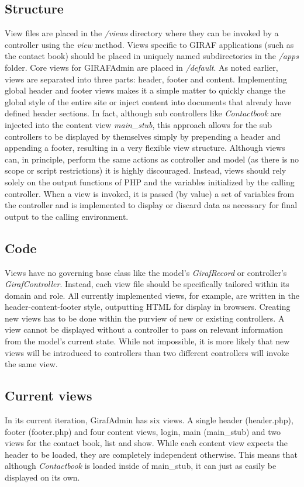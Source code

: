 \subsection{Structure}
View files are placed in the \emph{/views} directory where they can be invoked by a controller using the \emph{view} method. Views specific to GIRAF applications (such as the contact book) should be placed in uniquely named subdirectories in the \emph{/apps} folder. Core views for GIRAFAdmin are placed in \emph{/default}.
As noted earlier, views are separated into three parts: header, footer and content. Implementing global header and footer views makes it a simple matter to quickly change the global style of the entire site or inject content into documents that already have defined header sections. In fact, although sub controllers like \emph{Contactbook} are injected into the content view \emph{main\_stub}, this approach allows for the sub controllers to be displayed by themselves simply by prepending a header and appending a footer, resulting in a very flexible view structure.
Although views can, in principle, perform the same actions as controller and model (as there is no scope or script restrictions) it is highly discouraged. Instead, views should rely solely on the output functions of PHP and the variables initialized by the calling controller. When a view is invoked, it is passed (by value) a set of variables from the controller and is implemented to display or discard data as necessary for final output to the calling environment.

\subsection{Code}
Views have no governing base class like the model's \emph{GirafRecord} or controller's \emph{GirafController}. Instead, each view file should be specifically tailored within its domain and role. All currently implemented views, for example, are written in the header-content-footer style, outputting HTML for display in browsers.
Creating new views has to be done within the purview of new or existing controllers. A view cannot be displayed without a controller to pass on relevant information from the model's current state. While not impossible, it is more likely that new views will be introduced to controllers than two different controllers will invoke the same view.

\subsection{Current views}
In its current iteration, GirafAdmin has six views. A single header (header.php), footer (footer.php) and four content views, login, main (main\_stub) and two views for the contact book, list and show. While each content view expects the header to be loaded, they are completely independent otherwise. This means that although \emph{Contactbook} is loaded inside of main\_stub, it can just as easily be displayed on its own.
